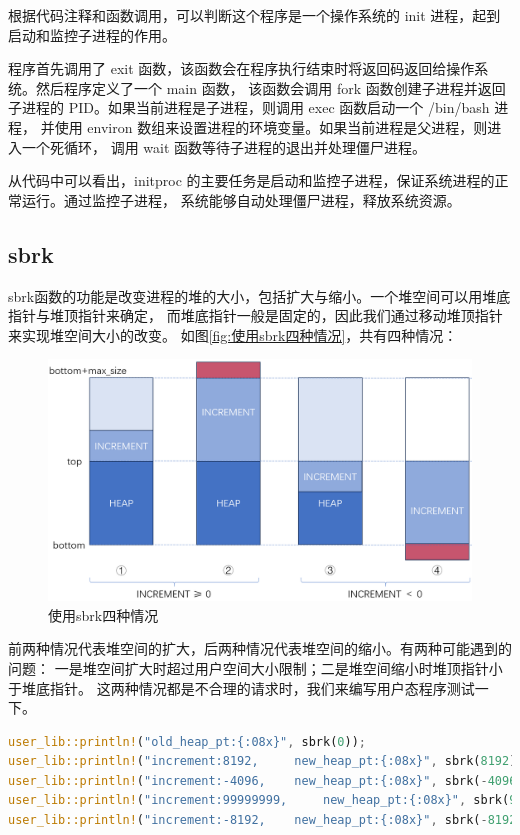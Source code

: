 根据代码注释和函数调用，可以判断这个程序是一个操作系统的 init 进程，起到启动和监控子进程的作用。

程序首先调用了 exit 函数，该函数会在程序执行结束时将返回码返回给操作系统。然后程序定义了一个 main 函数，
该函数会调用 fork 函数创建子进程并返回子进程的 PID。如果当前进程是子进程，则调用 exec 函数启动一个 /bin/bash 进程，
并使用 environ 数组来设置进程的环境变量。如果当前进程是父进程，则进入一个死循环，
调用 wait 函数等待子进程的退出并处理僵尸进程。

从代码中可以看出，initproc 的主要任务是启动和监控子进程，保证系统进程的正常运行。通过监控子进程，
系统能够自动处理僵尸进程，释放系统资源。


\subsection{sbrk}

sbrk函数的功能是改变进程的堆的大小，包括扩大与缩小。一个堆空间可以用堆底指针与堆顶指针来确定，
而堆底指针一般是固定的，因此我们通过移动堆顶指针来实现堆空间大小的改变。
如图\autoref{fig:使用sbrk四种情况}，共有四种情况：

\begin{figure}[htb]
    \centering
    \includegraphics[width=\textwidth]{figures/03-01-使用sbrk四种情况.png}
    \caption{
        使用sbrk四种情况
    }
    \label{fig:使用sbrk四种情况}
\end{figure}

前两种情况代表堆空间的扩大，后两种情况代表堆空间的缩小。有两种可能遇到的问题：
一是堆空间扩大时超过用户空间大小限制；二是堆空间缩小时堆顶指针小于堆底指针。
这两种情况都是不合理的请求时，我们来编写用户态程序测试一下。

\begin{lstlisting}[language={Rust}, label={code:sbrk_test},
    caption={sbrk_test}]
user_lib::println!("old_heap_pt:{:08x}", sbrk(0));
user_lib::println!("increment:8192, 	new_heap_pt:{:08x}", sbrk(8192));
user_lib::println!("increment:-4096, 	new_heap_pt:{:08x}", sbrk(-4096));
user_lib::println!("increment:99999999, 	new_heap_pt:{:08x}", sbrk(99999999));
user_lib::println!("increment:-8192, 	new_heap_pt:{:08x}", sbrk(-8192));
\end{lstlisting}

